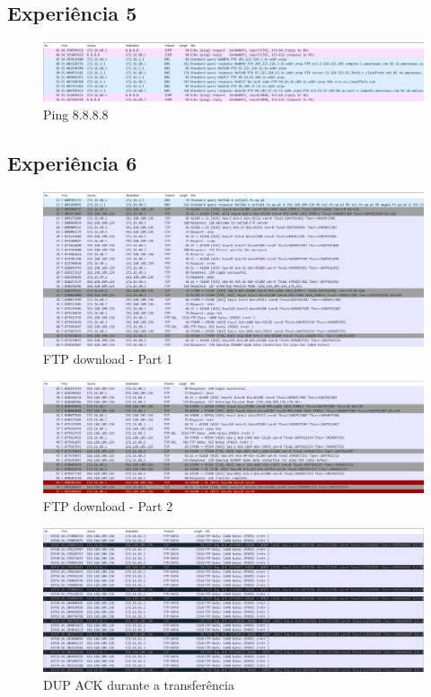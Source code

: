 \documentclass[article, a4paper, 11pt, oneside]{memoir}
\begin{document}
\newpage
\subsection{Experiência 5}
\begin{figure}[h]
	\centering
\includegraphics[scale=0.55]{exp5-step3.png}
\caption{Ping 8.8.8.8}
\end{figure}


\subsection{Experiência 6}
\begin{figure}[h]
	\centering
\includegraphics[scale=0.55]{exp6-step3-part1.png}
\caption{FTP download - Part 1}
\end{figure}

\begin{figure}[h]
	\centering
\includegraphics[scale=0.55]{exp6-step3-part2.png}
\caption{FTP download - Part 2}
\end{figure}

\newpage
\begin{figure}[h]
	\centering
\includegraphics[scale=0.55]{exp6-step5-error.png}
\caption{DUP ACK durante a transferência}
\end{figure}
\end{document}
